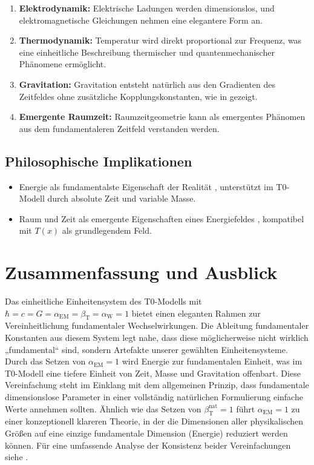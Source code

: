 \documentclass[12pt,a4paper]{article}
\newcommand{\Tfield}{T(x)}
\newcommand{\betaT}{\beta_{\text{T}}}
\newcommand{\alphaEM}{\alpha_{\text{EM}}}
\newcommand{\alphaW}{\alpha_{\text{W}}}
\begin{document}
	\begin{enumerate}
		\item \textbf{Elektrodynamik:} Elektrische Ladungen werden dimensionslos, und elektromagnetische Gleichungen nehmen eine elegantere Form an.
		\item \textbf{Thermodynamik:} Temperatur wird direkt proportional zur Frequenz, was eine einheitliche Beschreibung thermischer und quantenmechanischer Phänomene ermöglicht.
		\item \textbf{Gravitation:} Gravitation entsteht natürlich aus den Gradienten des Zeitfeldes ohne zusätzliche Kopplungskonstanten, wie in \cite{pascher_emergente_gravitation_2025} gezeigt.
		\item \textbf{Emergente Raumzeit:} Raumzeitgeometrie kann als emergentes Phänomen aus dem fundamentaleren Zeitfeld verstanden werden.
	\end{enumerate}
	
	\subsection{Philosophische Implikationen}
	\label{subsec:philosophical}
	
	\begin{itemize}
		\item Energie als fundamentalste Eigenschaft der Realität \cite{Wilczek2008}, unterstützt im T0-Modell durch absolute Zeit und variable Masse.
		\item Raum und Zeit als emergente Eigenschaften eines Energiefeldes \cite{Verlinde2011}, kompatibel mit \(\Tfield\) als grundlegendem Feld.
	\end{itemize}
	
	\section{Zusammenfassung und Ausblick}
	\label{sec:summary}
	
	Das einheitliche Einheitensystem des T0-Modells mit \(\hbar = c = G = \alphaEM = \betaT = \alphaW = 1\) bietet einen eleganten Rahmen zur Vereinheitlichung fundamentaler Wechselwirkungen. Die Ableitung fundamentaler Konstanten aus diesem System legt nahe, dass diese möglicherweise nicht wirklich „fundamental“ sind, sondern Artefakte unserer gewählten Einheitensysteme. Durch das Setzen von \(\alphaEM = 1\) wird Energie zur fundamentalen Einheit, was im T0-Modell eine tiefere Einheit von Zeit, Masse und Gravitation offenbart. Diese Vereinfachung steht im Einklang mit dem allgemeinen Prinzip, dass fundamentale dimensionslose Parameter in einer vollständig natürlichen Formulierung einfache Werte annehmen sollten. Ähnlich wie das Setzen von \(\betaT^{\text{nat}} = 1\) führt \(\alphaEM = 1\) zu einer konzeptionell klareren Theorie, in der die Dimensionen aller physikalischen Größen auf eine einzige fundamentale Dimension (Energie) reduziert werden können. Für eine umfassende Analyse der Konsistenz beider Vereinfachungen siehe \cite{pascher_alphabeta_2025}.
	
\end{document}
